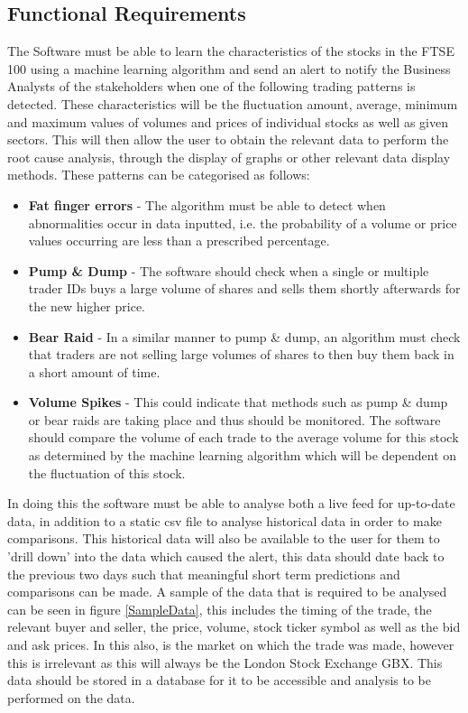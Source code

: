 \documentclass[11pt, oneside, a4paper]{article}
\begin{document}
\subsection{Functional Requirements}
The Software must be able to learn the characteristics of the stocks in the FTSE 100 using a machine learning
algorithm and send an alert to notify the Business Analysts of the stakeholders when one of the following
trading patterns is detected. These characteristics will be the fluctuation amount, average, minimum and maximum
values of volumes and prices of individual stocks as well as given sectors. This will then allow the user to obtain
the relevant data to perform the root cause analysis, through the display of graphs or other relevant data display
methods. These patterns can be categorised as follows:
\begin{itemize}
	\item \textbf{Fat finger errors} -  The algorithm must be able to detect when abnormalities occur in data inputted,
	i.e. the probability of a volume or price values occurring are less than a prescribed percentage.
	\item \textbf{Pump \& Dump} - The software should check when a single or multiple trader IDs buys a large volume of
	shares and sells them shortly afterwards for the new higher price.
	\item \textbf{Bear Raid} - In a similar manner to pump \& dump, an algorithm must check that traders are not selling
	large volumes of shares to then buy them back in a short amount of time.
	\item \textbf{Volume Spikes} - This could indicate that methods such as pump \& dump or bear raids are taking place
	and thus should be monitored. The software should compare the volume of each trade to the average volume for
	this stock as determined by the machine learning algorithm which will be dependent on the fluctuation of this stock.
\end{itemize}

In doing this the software must be able to analyse both a live feed for up-to-date data, in addition to a static
csv file to analyse historical data in order to make comparisons. This historical data will also be available to
the user for them to 'drill down' into the data which caused the alert, this data should date back to the previous
two days such that meaningful short term predictions and comparisons can be made. A sample of the data that is
required to be analysed can be seen in figure \ref{SampleData}, this includes the timing of the trade, the relevant
buyer and seller, the price, volume, stock ticker symbol as well as the bid and ask prices. In this also, is the
market on which the trade was made, however this is irrelevant as this will always be the London Stock Exchange GBX.
This data should be stored in a database for it to be accessible and analysis to be performed on the data.
\end{document}

